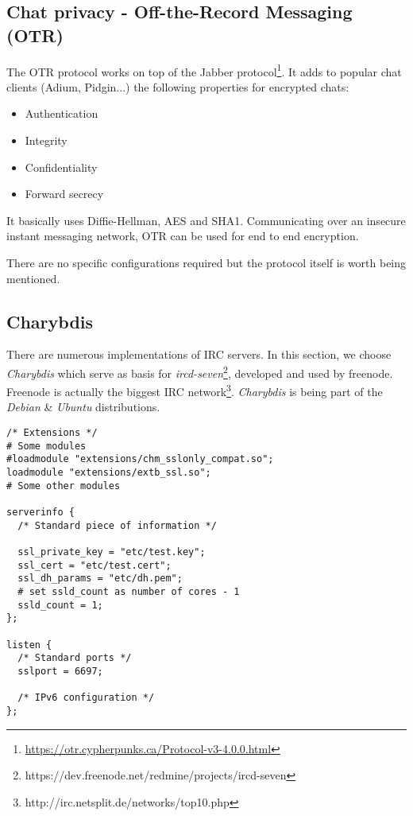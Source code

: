 \subsection{Chat privacy - Off-the-Record Messaging (OTR)}

The OTR protocol works on top of the Jabber protocol\footnote{\url{https://otr.cypherpunks.ca/Protocol-v3-4.0.0.html}}.  
It adds to popular chat clients (Adium, Pidgin...) the following properties for encrypted chats:
\begin{itemize}
    \item Authentication
    \item Integrity
    \item Confidentiality
    \item Forward secrecy
\end{itemize}

It basically uses Diffie-Hellman, AES and SHA1. Communicating over an insecure instant messaging network, OTR can be used for end to end encryption.

There are no specific configurations required but the protocol itself is worth being mentioned.


\subsection{Charybdis}


There are numerous implementations of IRC servers.  In this section, we choose \emph{Charybdis} which serve as basis for \emph{ircd-seven}\footnote{https://dev.freenode.net/redmine/projects/ircd-seven}, developed and used by freenode. Freenode is actually the biggest IRC network\footnote{http://irc.netsplit.de/networks/top10.php}. \emph{Charybdis} is being part of the \emph{Debian} \& \emph{Ubuntu} distributions.

\begin{lstlisting}
/* Extensions */
# Some modules 
#loadmodule "extensions/chm_sslonly_compat.so";
loadmodule "extensions/extb_ssl.so";
# Some other modules

serverinfo {
  /* Standard piece of information */
  
  ssl_private_key = "etc/test.key";
  ssl_cert = "etc/test.cert";
  ssl_dh_params = "etc/dh.pem";
  # set ssld_count as number of cores - 1
  ssld_count = 1; 
};

listen {
  /* Standard ports */
  sslport = 6697;

  /* IPv6 configuration */
};
\end{lstlisting}


